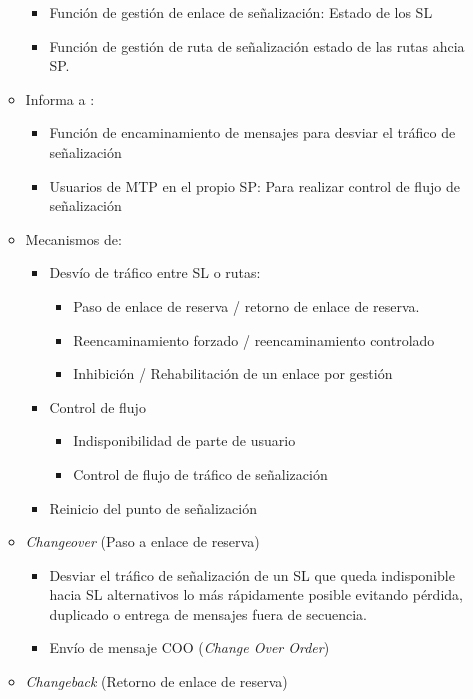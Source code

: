 \documentclass[10pt,portrait, twocolumn]{article}
\begin{document}
\begin{itemize}
\begin{itemize}
			\begin{itemize}
			\item Función de gestión de enlace de señalización: Estado de los SL
			\item Función de gestión de ruta de señalización estado de las rutas ahcia SP.
			\end{itemize}
		\item Informa a :
			\begin{itemize}
			\item Función de encaminamiento de mensajes para desviar el tráfico de señalización
			\item Usuarios de MTP en el propio SP: Para realizar control de flujo de señalización
			\end{itemize}
		\item Mecanismos de:
			\begin{itemize}
			\item Desvío de tráfico entre SL o rutas:
				\begin{itemize}
				\item Paso de enlace de reserva / retorno de enlace de reserva.
				\item Reencaminamiento forzado / reencaminamiento controlado
				\item Inhibición / Rehabilitación de un enlace por gestión
				\end{itemize} 
			\item Control de flujo
				\begin{itemize}
				\item Indisponibilidad de parte de usuario
				\item Control de flujo de tráfico de señalización
				\end{itemize}
			\item Reinicio del punto de señalización
			\end{itemize}
		\item \textit{Changeover} (Paso a enlace de reserva)
			\begin{itemize}
			\item Desviar el tráfico de señalización de un SL que queda indisponible hacia SL alternativos lo más rápidamente posible evitando pérdida, duplicado o entrega de mensajes fuera de secuencia.
			\item Envío de mensaje COO (\textit{Change Over Order})
			\end{itemize} 	
		\item \textit{Changeback} (Retorno de enlace de reserva)
			\begin{itemize}

\end{itemize}
\end{itemize}
\end{itemize}
\end{document}

